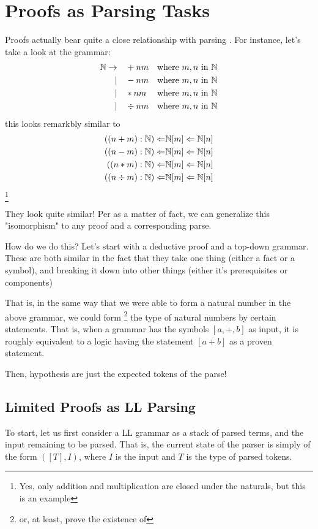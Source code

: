 \section{Proofs as Parsing Tasks}
Proofs actually bear quite a close relationship with parsing \needcite.
For instance, let's take a look at the grammar:
\begin{align}
	\mathbb{N} 	\to \quad& + n m & \operatorname{where} \, m,n \, \operatorname{in} \, \mathbb{N} \\
			\mid \quad& - n m & \operatorname{where} \, m,n \, \operatorname{in} \, \mathbb{N} \\
			\mid \quad& * n m & \operatorname{where} \, m,n \, \operatorname{in} \, \mathbb{N} \\
			\mid \quad& \div n m & \operatorname{where} \, m,n \, \operatorname{in} \, \mathbb{N}
\end{align}
this looks remarkbly similar to 
\begin{align}
	((n + m) : \mathbb{N}) \Leftarrow &\mathbb{N} [m] \Leftarrow \mathbb{N} [n] \\
	((n - m) : \mathbb{N}) \Leftarrow &\mathbb{N} [m] \Leftarrow \mathbb{N} [n] \\
	((n * m) : \mathbb{N}) \Leftarrow &\mathbb{N} [m] \Leftarrow \mathbb{N} [n] \\
	((n \div m) : \mathbb{N}) \Leftarrow &\mathbb{N} [m] \Leftarrow \mathbb{N} [n]
\end{align}
\footnote{Yes, only addition and multiplication are closed under the naturals, but this is an example}

They look quite similar!
Per as a matter of fact, we can generalize this "isomorphism" to any proof and a corresponding parse.

How do we do this?
Let's start with a deductive proof and a top-down grammar.
These are both similar in the fact that they take one thing (either a fact or a symbol), and breaking it down into other things (either it's prerequisites or components)

That is, in the same way that we were able to form a natural number in the above grammar, we could form \footnote{or, at least, prove the existence of} the type of natural numbers by certain statements.
That is, when a grammar has the symbols $[a,+,b]$ as input, it is roughly equivalent to a logic having the statement $[a+b]$ as a proven statement.

Then, hypothesis are just the expected tokens of the parse!

\subsection{Limited Proofs as LL Parsing}
To start, let us first consider a LL grammar as a stack of parsed terms, and the input remaining to be parsed.
That is, the current state of the parser is simply of the form $([T],I)$, where $I$ is the input and $T$ is the type of parsed tokens.

